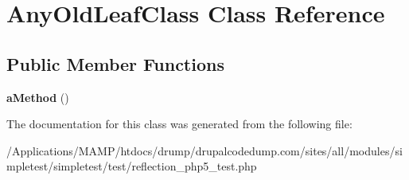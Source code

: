 \hypertarget{class_any_old_leaf_class}{
\section{AnyOldLeafClass Class Reference}
\label{class_any_old_leaf_class}
}
\subsection*{Public Member Functions}
\begin{DoxyCompactItemize}
\item 
\hypertarget{class_any_old_leaf_class_a84a74109efc2bfbaf25f69bc733b43b2}{
{\bfseries aMethod} ()}
\label{class_any_old_leaf_class_a84a74109efc2bfbaf25f69bc733b43b2}

\end{DoxyCompactItemize}


The documentation for this class was generated from the following file:\begin{DoxyCompactItemize}
\item 
/Applications/MAMP/htdocs/drump/drupalcodedump.com/sites/all/modules/simpletest/simpletest/test/reflection\_\-php5\_\-test.php\end{DoxyCompactItemize}
